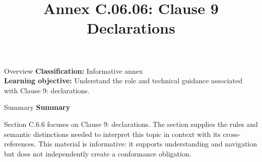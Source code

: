 \documentclass[10pt,letterpaper]{article}
\title{Annex C.06.06: Clause 9 Declarations}
\author{}
\date{}
\begin{document}
\maketitle
\begin{CornellOverviewBox}{Overview}
\textbf{Classification:} Informative annex\\[2pt]
\textbf{Learning objective:} Understand the role and technical guidance associated with Clause 9: declarations.
\end{CornellOverviewBox}\begin{CornellSummaryBox}{Summary}
{\sffamily\bfseries\color{Accent} Summary}\par\vspace{3pt}Section C.6.6 focuses on Clause 9: declarations. The section supplies the rules and semantic distinctions needed to interpret this topic in context with its cross-references. This material is informative: it supports understanding and navigation but does not independently create a conformance obligation.
\end{CornellSummaryBox}
\end{document}
